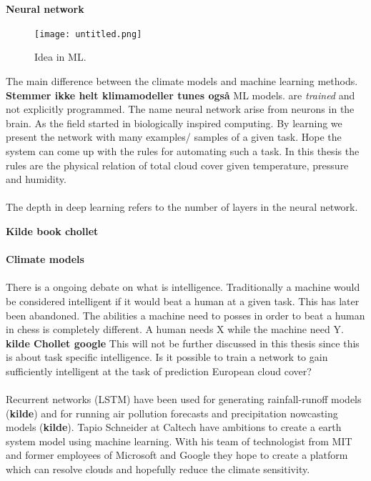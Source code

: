 \\ \\ 
\textbf{Neural network}
\begin{figure}
    \centering
    \texttt{[image: untitled.png]}
    \caption{Idea in ML.}
    \label{fig:ml}
\end{figure}
The main difference between the climate models and machine learning methods. \textbf{Stemmer ikke helt klimamodeller tunes også} ML models. are \textit{trained} and not explicitly programmed. The name neural network arise from neurons in the brain. As the field started in biologically
inspired computing. By learning we present the network with many examples/ samples of a given task. Hope the system can come up with the rules for automating such a task. In this thesis the rules are the physical relation of total cloud cover given temperature, pressure and humidity.
\\ \\
The depth in deep learning refers to the number of layers in the neural network.



\textbf{Kilde book chollet}
\\ \\
\textbf{Climate models}
\\ \\
There is a ongoing debate on what is intelligence. Traditionally a machine would be considered intelligent if it would beat a human at a given task. This has later been abandoned. The abilities a machine need to posses in order to beat a human in chess is completely different. A human needs X while the machine need Y. \textbf{kilde Chollet google} This will not be further discussed in this thesis since this is about task specific intelligence. Is it possible to train a network to gain sufficiently intelligent at the task of prediction European cloud cover?
\\ \\
Recurrent networks (LSTM) have been used for generating rainfall-runoff models (\textbf{kilde}) and for running air pollution forecasts and precipitation nowcasting models (\textbf{kilde}). Tapio Schneider at Caltech have ambitions to create a earth system model using machine learning. With his team of technologist from MIT and former employees of Microsoft and Google they hope to create a platform which can resolve clouds and hopefully reduce the climate sensitivity. 
\\ \\

